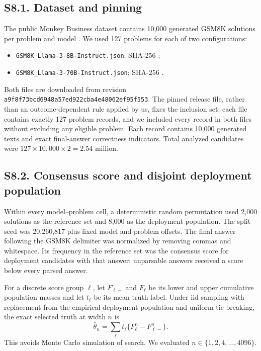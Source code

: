 \documentclass[10pt,twocolumn]{article}
\begin{document}
\subsection*{S8.1. Dataset and pinning}

The public Monkey Business dataset contains 10,000 generated GSM8K solutions per problem and model \citep{brown2024}. We used 127 problems for each of two configurations:
\begin{itemize}
\item \texttt{GSM8K\_Llama-3-8B-Instruct.json}; SHA-256 \texttt{};
\item \texttt{GSM8K\_Llama-3-70B-Instruct.json}; SHA-256 \texttt{}.
\end{itemize}
Both files are downloaded from revision \texttt{a9f8f73bcd6948a57ed922cba4e48062ef95f553}. The pinned release file, rather than an outcome-dependent rule applied by us, fixes the inclusion set: each file contains exactly 127 problem records, and we included every record in both files without excluding any eligible problem. Each record contains 10,000 generated texts and exact final-answer correctness indicators. Total analyzed candidates were $127\times10{,}000\times2=2.54$ million.

\subsection*{S8.2. Consensus score and disjoint deployment population}

Within every model--problem cell, a deterministic random permutation used 2,000 solutions as the reference set and 8,000 as the deployment population. The split seed was 20,260,817 plus fixed model and problem offsets. The final answer following the GSM8K delimiter was normalized by removing commas and whitespace. Its frequency in the reference set was the consensus score for deployment candidates with that answer; unparsable answers received a score below every parsed answer.

For a discrete score group $\ell$, let $F_{\ell-}$ and $F_\ell$ be its lower and upper cumulative population masses and let $t_\ell$ be its mean truth label. Under iid sampling with replacement from the empirical deployment population and uniform tie breaking, the exact selected truth at width $n$ is
\begin{equation}
\widehat\theta_n
=\sum_\ell t_\ell\{F_\ell^n-F_{\ell-}^n\}.
\label{si:eq:empirical-winner}
\end{equation}
This avoids Monte Carlo simulation of search. We evaluated $n\in\{1,2,4,\ldots,4096\}$.
\end{document}
